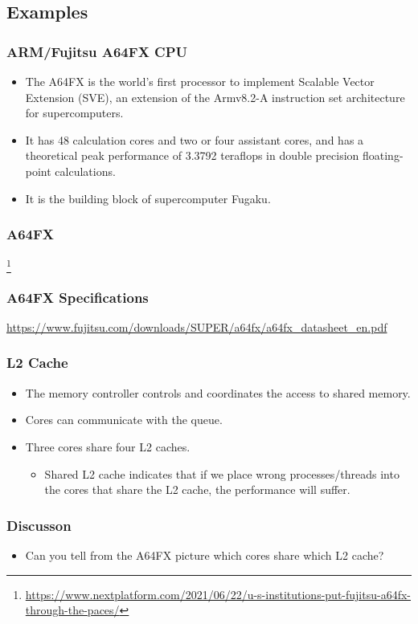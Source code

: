 \documentclass{beamer}
\begin{document}
\begin{CJK}{UTF8}{bsmi}
\subsection{Examples}

\begin{frame}
\frametitle{ARM/Fujitsu A64FX CPU} 
\begin{itemize}
\item The A64FX is the world's first processor to implement Scalable
  Vector Extension (SVE), an extension of the Armv8.2-A instruction
  set architecture for supercomputers.
\item It has 48 calculation cores and two or four assistant cores, and
  has a theoretical peak performance of 3.3792 teraflops in double
  precision floating-point calculations.
\item It is the building block of supercomputer Fugaku. 
\end{itemize}
\end{frame}

\begin{frame}
\frametitle{A64FX}
\centerline{}
\footnote{\url{https://www.nextplatform.com/2021/06/22/u-s-institutions-put-fujitsu-a64fx-through-the-paces/}}
\end{frame}

\begin{frame}
\frametitle{A64FX Specifications}
\url{https://www.fujitsu.com/downloads/SUPER/a64fx/a64fx_datasheet_en.pdf}
\end{frame}

\begin{frame}
\frametitle{L2 Cache}
\begin{itemize}
\item The memory controller controls and coordinates the access to shared memory.
\item Cores can communicate with the queue.  
\item Three cores share four L2 caches.  
  \begin{itemize}
    \item Shared L2 cache indicates that if we place wrong
      processes/threads into the cores that share the L2 cache, the
      performance will suffer.
  \end{itemize}
\end{itemize}
\end{frame}

\begin{frame}
\frametitle{Discusson}
\begin{itemize}
\item Can you tell from the A64FX picture which cores share which L2 cache?
\end{itemize}
\end{frame}



\end{CJK}
\end{document}
